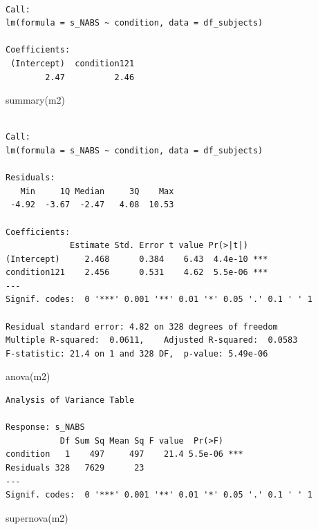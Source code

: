\documentclass[
  letterpaper,
  DIV=11,
  numbers=noendperiod]{scrreprt}
\newenvironment{Shaded}{\begin{snugshade}}{\end{snugshade}}
\newcommand{\FunctionTok}[1]{\textcolor[rgb]{0.28,0.35,0.67}{#1}}
\newcommand{\NormalTok}[1]{\textcolor[rgb]{0.00,0.23,0.31}{#1}}
\begin{document}
\begin{verbatim}

Call:
lm(formula = s_NABS ~ condition, data = df_subjects)

Coefficients:
 (Intercept)  condition121  
        2.47          2.46  
\end{verbatim}

\begin{Shaded}
\begin{Highlighting}[]
\FunctionTok{summary}\NormalTok{(m2)}
\end{Highlighting}
\end{Shaded}

\begin{verbatim}

Call:
lm(formula = s_NABS ~ condition, data = df_subjects)

Residuals:
   Min     1Q Median     3Q    Max 
 -4.92  -3.67  -2.47   4.08  10.53 

Coefficients:
             Estimate Std. Error t value Pr(>|t|)    
(Intercept)     2.468      0.384    6.43  4.4e-10 ***
condition121    2.456      0.531    4.62  5.5e-06 ***
---
Signif. codes:  0 '***' 0.001 '**' 0.01 '*' 0.05 '.' 0.1 ' ' 1

Residual standard error: 4.82 on 328 degrees of freedom
Multiple R-squared:  0.0611,    Adjusted R-squared:  0.0583 
F-statistic: 21.4 on 1 and 328 DF,  p-value: 5.49e-06
\end{verbatim}

\begin{Shaded}
\begin{Highlighting}[]
\FunctionTok{anova}\NormalTok{(m2)}
\end{Highlighting}
\end{Shaded}

\begin{verbatim}
Analysis of Variance Table

Response: s_NABS
           Df Sum Sq Mean Sq F value  Pr(>F)    
condition   1    497     497    21.4 5.5e-06 ***
Residuals 328   7629      23                    
---
Signif. codes:  0 '***' 0.001 '**' 0.01 '*' 0.05 '.' 0.1 ' ' 1
\end{verbatim}

\begin{Shaded}
\begin{Highlighting}[]
\FunctionTok{supernova}\NormalTok{(m2)}
\end{Highlighting}
\end{Shaded}
\end{document}
